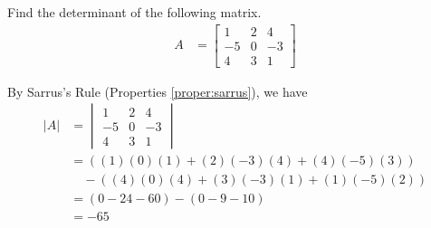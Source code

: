 \begin{exmp}
Find the determinant of the following matrix.
\begin{align*}
A &=
\begin{bmatrix}
1 & 2 & 4 \\
-5 & 0 & -3 \\
4 & 3 & 1
\end{bmatrix} 
\end{align*}
\end{exmp}
\begin{solution}
By Sarrus's Rule (Properties \ref{proper:sarrus}), we have
\begin{align*}
|A| &=
\begin{vmatrix}
1 & 2 & 4 \\
-5 & 0 & -3 \\
4 & 3 & 1
\end{vmatrix} \\
&= ((1)(0)(1) + (2)(-3)(4) + (4)(-5)(3)) \\
&\quad- ((4)(0)(4) + (3)(-3)(1) + (1)(-5)(2)) \\
&= (0 - 24 - 60) - (0 - 9 - 10) \\
&= -65
\end{align*}
\end{solution}

